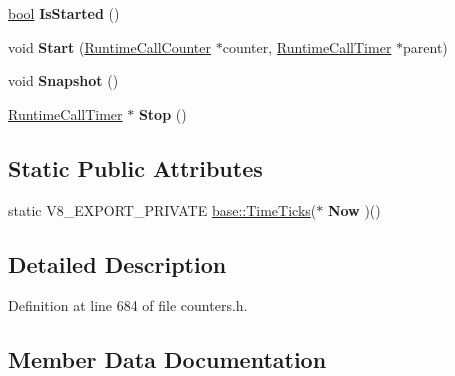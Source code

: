 \begin{DoxyCompactItemize}
\mbox{\hyperlink{classbool}{bool}} {\bfseries Is\+Started} ()
\item 
\mbox{\label{classv8_1_1internal_1_1RuntimeCallTimer_a12d402530f324e001f7c3ece911bb10a}} 
void {\bfseries Start} (\mbox{\hyperlink{classv8_1_1internal_1_1RuntimeCallCounter}{Runtime\+Call\+Counter}} $\ast$counter, \mbox{\hyperlink{classv8_1_1internal_1_1RuntimeCallTimer}{Runtime\+Call\+Timer}} $\ast$parent)
\item 
\mbox{\label{classv8_1_1internal_1_1RuntimeCallTimer_af11006ce3ef185eab342a1c5e73b2773}} 
void {\bfseries Snapshot} ()
\item 
\mbox{\label{classv8_1_1internal_1_1RuntimeCallTimer_ac1919ebae231974bffbfe0bce3b1c376}} 
\mbox{\hyperlink{classv8_1_1internal_1_1RuntimeCallTimer}{Runtime\+Call\+Timer}} $\ast$ {\bfseries Stop} ()
\end{DoxyCompactItemize}
\subsection*{Static Public Attributes}
\begin{DoxyCompactItemize}
\item 
static V8\+\_\+\+E\+X\+P\+O\+R\+T\+\_\+\+P\+R\+I\+V\+A\+TE \mbox{\hyperlink{classv8_1_1base_1_1TimeTicks}{base\+::\+Time\+Ticks}}($\ast$ {\bfseries Now} )()
\end{DoxyCompactItemize}


\subsection{Detailed Description}


Definition at line 684 of file counters.\+h.



\subsection{Member Data Documentation}
\mbox{\label{classv8_1_1internal_1_1RuntimeCallTimer_a53e0e314996b55a3eee5958f3ec20418}} 
